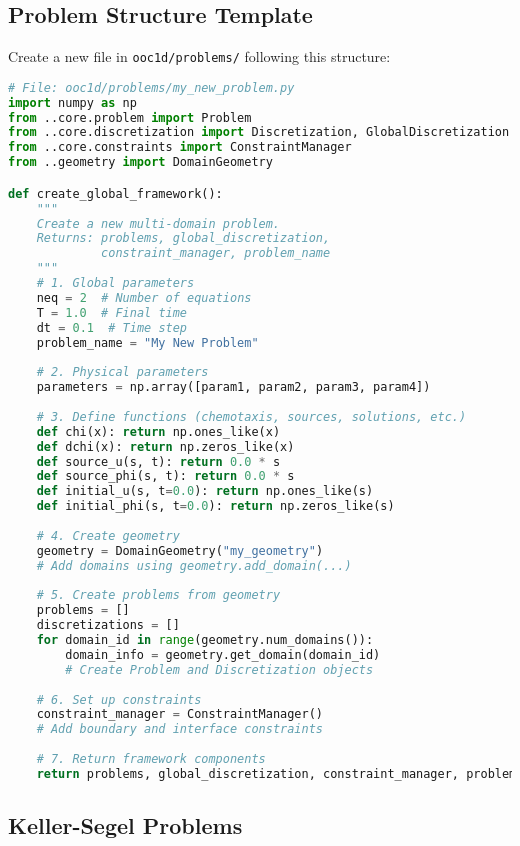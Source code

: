 \documentclass[11pt,a4paper]{article}
\newcommand{\code}[1]{\texttt{#1}}
\begin{document}
\subsection{Problem Structure Template}

Create a new file in \code{ooc1d/problems/} following this structure:

\begin{lstlisting}[language=Python, caption={Problem Template Structure}]
# File: ooc1d/problems/my_new_problem.py
import numpy as np
from ..core.problem import Problem
from ..core.discretization import Discretization, GlobalDiscretization
from ..core.constraints import ConstraintManager
from ..geometry import DomainGeometry

def create_global_framework():
    """
    Create a new multi-domain problem.
    Returns: problems, global_discretization, 
             constraint_manager, problem_name
    """
    # 1. Global parameters
    neq = 2  # Number of equations
    T = 1.0  # Final time
    dt = 0.1  # Time step
    problem_name = "My New Problem"
    
    # 2. Physical parameters
    parameters = np.array([param1, param2, param3, param4])
    
    # 3. Define functions (chemotaxis, sources, solutions, etc.)
    def chi(x): return np.ones_like(x)
    def dchi(x): return np.zeros_like(x)
    def source_u(s, t): return 0.0 * s
    def source_phi(s, t): return 0.0 * s
    def initial_u(s, t=0.0): return np.ones_like(s)
    def initial_phi(s, t=0.0): return np.zeros_like(s)
    
    # 4. Create geometry
    geometry = DomainGeometry("my_geometry")
    # Add domains using geometry.add_domain(...)
    
    # 5. Create problems from geometry
    problems = []
    discretizations = []
    for domain_id in range(geometry.num_domains()):
        domain_info = geometry.get_domain(domain_id)
        # Create Problem and Discretization objects
    
    # 6. Set up constraints
    constraint_manager = ConstraintManager()
    # Add boundary and interface constraints
    
    # 7. Return framework components
    return problems, global_discretization, constraint_manager, problem_name
\end{lstlisting}

\subsection{Keller-Segel Problems}
\end{document}

